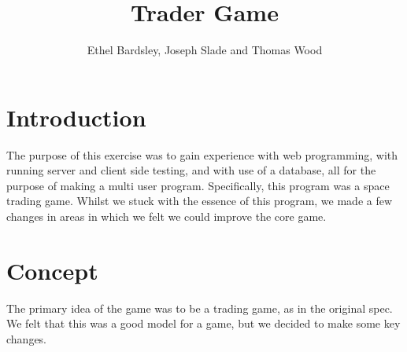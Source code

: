 \documentclass[12pt]{amsart}
\title{Trader Game}
\author{Ethel Bardsley, Joseph Slade and Thomas Wood}
\begin{document}
\maketitle

\section{Introduction}
The purpose of this exercise was to gain experience with web programming, 
with running server and client side testing,  and with use of a database, 
all for the purpose of making a multi user program. Specifically,  
this program was a space trading game.  Whilst we stuck with the essence
of this program,  we made a few changes in areas in which we felt we could
improve the core game.
\section{Concept}
  The primary idea of the game was to be a trading game,  as in the original 
spec. We felt that this was a good model for a game,  but we decided to make 
some key changes.  
\end{document}
